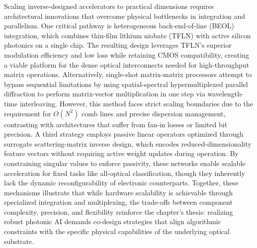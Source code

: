 Scaling inverse-designed accelerators to practical dimensions requires architectural innovations that overcome physical bottlenecks in integration and parallelism. One critical pathway is heterogeneous back-end-of-line (BEOL) integration, which combines thin-film lithium niobate (TFLN) with active silicon photonics on a single chip. \citep{s2_9b444e84d20ae6e3d62d2d4df30268b5a53baad2_40af2cc9} The resulting design leverages TFLN's superior modulation efficiency and low loss while retaining CMOS compatibility, creating a viable platform for the dense optical interconnects needed for high-throughput matrix operations. Alternatively, single-shot matrix-matrix processors attempt to bypass sequential limitations by using spatial-spectral hypermultiplexed parallel diffraction to perform matrix-vector multiplication in one step via wavelength-time interleaving. \citep{doi_10_1038_s41467_026_68452_x_bafa2de0} However, this method faces strict scaling boundaries due to the requirement for \(O(N^{2})\) comb lines and precise dispersion management, contrasting with architectures that suffer from fan-in losses or limited bit precision. A third strategy employs passive linear operators optimized through surrogate scattering-matrix inverse design, which encodes reduced-dimensionality feature vectors without requiring active weight updates during operation. By constraining singular values to enforce passivity, these networks enable scalable acceleration for fixed tasks like all-optical classification, though they inherently lack the dynamic reconfigurability of electronic counterparts. Together, these mechanisms illustrate that while hardware scalability is achievable through specialized integration and multiplexing, the trade-offs between component complexity, precision, and flexibility reinforce the chapter's thesis: realizing robust photonic AI demands co-design strategies that align algorithmic constraints with the specific physical capabilities of the underlying optical substrate. \citep{s2_9b444e84d20ae6e3d62d2d4df30268b5a53baad2_40af2cc9} \citep{doi_10_1038_s41467_026_68452_x_bafa2de0} \citep{s2_753a5d83a96e0194da93bcb6f20fa0bd356e37fa_c11e3796}

